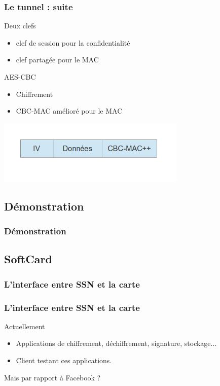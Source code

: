 \documentclass{beamer}
\begin{document}
\begin{frame}
    \frametitle{Le tunnel : suite}

\begin{exampleblock}{Deux clefs}
        \begin{itemize}
            \item clef de session pour la confidentialité
            \item clef partagée pour le MAC
        \end{itemize}
	\end{exampleblock}
\begin{exampleblock}{AES-CBC}
        \begin{itemize}
            \item Chiffrement
            \item CBC-MAC amélioré pour le MAC
        \end{itemize}
	\end{exampleblock}
 \includegraphics[width=9cm]{packet}
\end{frame}

\subsection{Démonstration}
\begin{frame}
    \frametitle{Démonstration}
    \begin{block}{}
    \end{block}
\end{frame}

\subsection{SoftCard}
\begin{frame}
\frametitle{L'interface entre SSN et la carte}
    \frametitle{L'interface entre SSN et la carte}
    \begin{block}{Actuellement}
        \begin{itemize}
            \item Applications de chiffrement, déchiffrement, signature, stockage...
            \item Client testant ces applications.
        \end{itemize}
    \end{block}

    Mais par rapport à Facebook ?
\end{frame}
\end{document}
